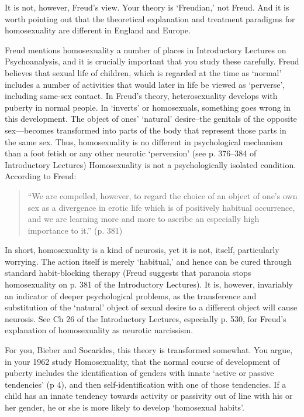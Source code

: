 It is not, however, Freud's view. Your theory is `Freudian,' not Freud. And it is worth pointing out that the theoretical explanation and treatment paradigms for homosexuality are different in England and Europe.

Freud mentions homosexuality a number of places in Introductory Lectures on Psychoanalysis, and it is crucially important that you study these carefully. Freud believes that sexual life of children, which is regarded at the time as `normal' includes a number of activities that would later in life be viewed as `perverse', including same-sex contact. In Freud's theory, heterosexuality develops with puberty in normal people. In `inverts' or homosexuals, something goes wrong in this development. The object of ones' `natural' desire--the genitals of the opposite sex---becomes transformed into parts of the body that represent those parts in the same sex. Thus, homosexuality is no different in psychological mechanism than a foot fetish or any other neurotic `perversion' (see p. 376--384 of Introductory Lectures) Homosexuality is not a psychologically isolated condition. According to Freud:

\begin{quote}

``We are compelled, however, to regard the choice of an object of one's own sex as a divergence in erotic life which is of positively habitual occurrence, and we are learning more and more to ascribe an especially high importance to it.'' (p. 381)
\end{quote}

In short, homosexuality is a kind of neurosis, yet it is not, itself, particularly worrying. The action itself is merely `habitual,' and hence can be cured through standard habit-blocking therapy (Freud suggests that paranoia stops homosexuality on p. 381 of the Introductory Lectures). It is, however, invariably an indicator of deeper psychological problems, as the transference and substitution of the `natural' object of sexual desire to a different object will cause neurosis. See Ch 26 of the Introductory Lectures, especially p. 530, for Freud's explanation of homosexuality as neurotic narcissism.

For you, Bieber and Socarides, this theory is transformed somewhat. You argue, in your 1962 study Homosexuality, that the normal course of development of puberty includes the identification of genders with innate `active or passive tendencies' (p 4), and then self-identification with one of those tendencies. If a child has an innate tendency towards activity or passivity out of line with his or her gender, he or she is more likely to develop `homosexual habits'.

